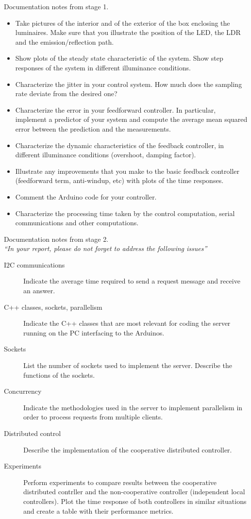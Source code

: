 \documentclass[english,fira]{ist-report}
\begin{document}
Documentation notes from stage 1.
\begin{itemize}
	\item Take pictures of the interior and of the exterior of the box enclosing the luminaires. Make sure that you illustrate the position of the LED, the LDR and the emission/reflection path.
	\item Show plots of the steady state characteristic of the system. Show step responses of the system in different illuminance conditions.
	\item Characterize the jitter in your control system. How much does the sampling rate deviate from the desired one?
	\item Characterize the error in your feedforward controller. In particular, implement a predictor of your system and compute the average mean squared error between the prediction and the measurements.
	\item Characterize the dynamic characteristics of the feedback controller, in different illuminance conditions (overshoot, damping factor).
	\item Illustrate any improvements that you make to the basic feedback controller (feedforward term, anti-windup, etc) with plots of the time responses.
	\item Comment the Arduino code for your controller.
	\item Characterize the processing time taken by the control computation, serial communications and other computations.
\end{itemize}

Documentation notes from stage 2. \\
\textit{``In your report, please do not forget to address the following issues''}
\begin{description}
	\item[I$2$C communications] Indicate the average time required to send a request message and receive an answer.
	\item[C++ classes, sockets, parallelism] Indicate the C++ classes that are most relevant for coding the server running on the PC interfacing to the Arduinos.
	\item[Sockets] List the number of sockets used to implement the server. Describe the functions of the sockets.
	\item[Concurrency] Indicate the methodologies used in the server to implement parallelism in order to process requests from multiple clients.
	\item[Distributed control] Describe the implementation of the cooperative distributed controller.
	\item[Experiments] Perform experiments to compare results between the cooperative distributed contrller and the non-cooperative controller (independent local controllers). Plot the time response of both controllers in similar situations and create a table with their performance metrics.
\end{description}
\end{document}

